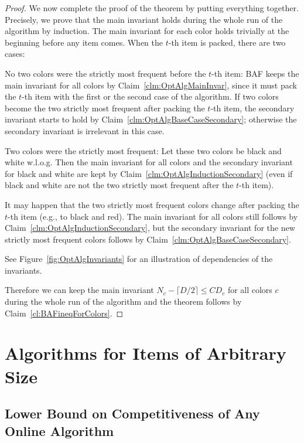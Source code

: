 \documentclass[11pt,a4paper]{article}
\def\vari#1{\mathit{#1}}
\begin{document}
\begin{proof}
We now complete the proof of the theorem by putting everything together.
Precisely, we prove that the main invariant holds during
the whole run of the algorithm by induction. 
The main invariant for each color holds trivially at the beginning before any item comes.
When the $t$-th item is packed, there are two cases:
\begin{compactitem}
\item No two colors were the strictly most frequent before the $t$-th item:
BAF keeps the main invariant for all colors by Claim~\ref{clm:OptAlgMainInvar}, since it
must pack the $t$-th item with the first or the second case of the algorithm.
If two colors become the two strictly most frequent after packing the $t$-th item,
the secondary invariant starts to hold by Claim~\ref{clm:OptAlgBaseCaseSecondary};
otherwise the secondary invariant is irrelevant in this case.
\item Two colors were the strictly most frequent:
Let these two colors be black and white w.l.o.g.
Then the main invariant for all colors and the secondary invariant for black and white are kept
by Claim~\ref{clm:OptAlgInductionSecondary}
(even if black and white are not the two strictly most frequent after the $t$-th item).

It may happen that the two strictly most frequent colors change after packing the $t$-th item
(e.g., to black and red). The main invariant for all colors still follows by Claim~\ref{clm:OptAlgInductionSecondary},
but the secondary invariant for the new strictly most frequent colors follows by Claim~\ref{clm:OptAlgBaseCaseSecondary}.
\end{compactitem}

See Figure~\ref{fig:OptAlgInvariants} for an illustration of dependencies of the invariants.

Therefore we can keep the main invariant
$N_c - \lceil D/2\rceil \leq \vari{CD}_c$ for all colors $c$ during
the whole run of the algorithm and the theorem follows by
Claim~\ref{cl:BAFineqForColors}.
\end{proof}

\section{Algorithms for Items of Arbitrary Size}\label{sec:anySize}

\subsection{Lower Bound on Competitiveness of Any Online Algorithm}\label{sec:anySizeLB}
\end{document}
